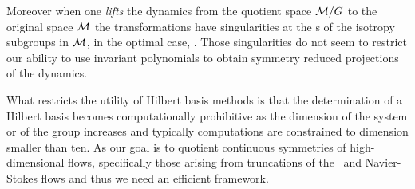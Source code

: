 Moreover when
one \emph{lifts} the dynamics from the quotient space
$\mathcal{M}/G$ to the original space $\mathcal{M}$ the transformations
have singularities at the \fixedsp s of
the isotropy subgroups in $\mathcal{M}$, in the optimal case, \cf
{}. Those singularities do not seem to
restrict our ability to use invariant polynomials to obtain
symmetry reduced projections of the dynamics.

What restricts the utility of Hilbert basis methods is that the
determination of a Hilbert basis becomes computationally
prohibitive as the dimension of the system or of the group
increases and typically
computations are constrained to dimension smaller than ten. As
our goal is to quotient continuous symmetries of
high-dimensional flows, specifically those arising from
truncations of the \KS\ and Navier-Stokes flows
and thus we need an efficient framework.




